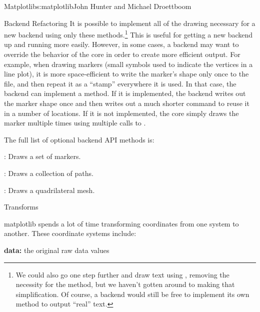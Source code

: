 \begin{aosachapter}{Matplotlib}{s:matplotlib}{John Hunter and Michael Droettboom}
\begin{aosasect1}{Backend Refactoring}
It is possible to implement all of the drawing necessary for a new
backend using only these methods.\footnote{We could also go one step
  further and draw text using , removing the
  necessity for the  method, but we haven't gotten
  around to making that simplification.  Of course, a backend would
  still be free to implement its own  method to
  output ``real'' text.}  This is useful for getting a new backend
up and running more easily.  However, in some cases, a backend may
want to override the behavior of the core in order to create more
efficient output.  For example, when drawing markers (small symbols
used to indicate the vertices in a line plot), it is more
space-efficient to write the marker's shape only once to the file, and
then repeat it as a ``stamp'' everywhere it is used.  In that case,
the backend can implement a  method.  If it is
implemented, the backend writes out the marker shape once and then
writes out a much shorter command to reuse it in a number of
locations.  If it is not implemented, the core simply draws the marker
multiple times using multiple calls to .

The full list of optional backend API methods is:

\begin{aosaitemize}

  \item {}: Draws a set of markers.

  \item {}: Draws a collection of paths.

  \item {}: Draws a quadrilateral mesh.

\end{aosaitemize}

\end{aosasect1}

\begin{aosasect1}{Transforms}


matplotlib spends a lot of time transforming coordinates from one
system to another.  These coordinate systems include:

\begin{aosaitemize}
\item \textbf{data:} the original raw data values


\end{aosaitemize}
\end{aosasect1}
\end{aosachapter}
